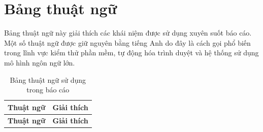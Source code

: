 \chapter*{Bảng thuật ngữ}
\label{glossary}

Bảng thuật ngữ này giải thích các khái niệm được sử dụng xuyên suốt báo cáo. Một số thuật ngữ được giữ nguyên bằng tiếng Anh do đây là cách gọi phổ biến trong lĩnh vực kiểm thử phần mềm, tự động hóa trình duyệt và hệ thống sử dụng mô hình ngôn ngữ lớn.

{\small
\begin{longtable}{|p{4.2cm}|p{10.0cm}|}
\caption{Bảng thuật ngữ sử dụng trong báo cáo}
\label{tab:glossary_terms} \\
\hline
\textbf{Thuật ngữ} & \textbf{Giải thích} \\
\hline
\endfirsthead

\hline
\textbf{Thuật ngữ} & \textbf{Giải thích} \\
\hline
\endhead


\end{longtable}}
